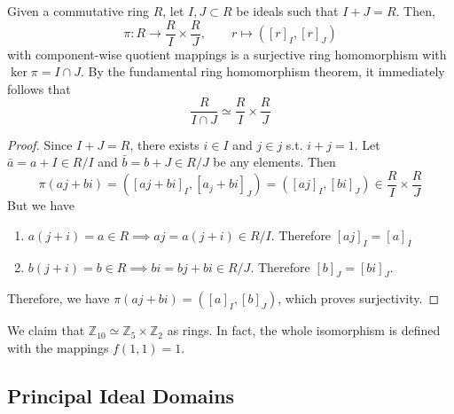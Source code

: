   \begin{corollary}
    Given a commutative ring $R$, let $I, J \subset R$ be ideals such that $I + J = R$. Then, 
    \begin{equation}
      \pi: R \to \frac{R}{I} \times \frac{R}{J}, \qquad r \mapsto ([r]_I, [r]_J)
    \end{equation}
    with component-wise quotient mappings is a surjective ring homomorphism with $\ker{\pi} = I \cap J$. By the fundamental ring homomorphism theorem, it immediately follows that 
    \begin{equation}
      \frac{R}{I \cap J} \simeq \frac{R}{I} \times \frac{R}{J}
    \end{equation}
  \end{corollary}
  \begin{proof}
    Since $I + J = R$, there exists $i \in I$ and $j \in j$ s.t. $i + j = 1$. Let $\bar{a} = a + I \in R/I$ and $\bar{b} = b + J \in R/J$ be any elements. Then 
    \begin{equation}
      \pi(aj + bi) = ([aj + bi]_I, [a_j + bi]_J) = ([aj]_I, [bi]_J) \in \frac{R}{I} \times \frac{R}{J}
    \end{equation} 
    But we have 
    \begin{enumerate}
      \item $a(j + i) = a \in R \implies aj = a(j + i) \in R/I$. Therefore $[aj]_I = [a]_I$ 
      \item $b(j + i) = b \in R \implies bi = bj + bi \in R/J$. Therefore $[b]_J = [bi]_J$. 
    \end{enumerate}
    Therefore, we have $\pi(aj + bi) = ([a]_I, [b]_J)$, which proves surjectivity. 
  \end{proof} 

  \begin{example}
    
  \end{example} 

  \begin{example}
    We claim that $\mathbb{Z}_{10} \simeq \mathbb{Z}_5 \times \mathbb{Z}_2$ as rings. In fact, the whole isomorphism is defined with the mappings $f(1, 1) = 1$. 
  \end{example}

\subsection{Principal Ideal Domains}

